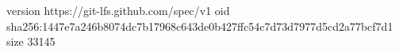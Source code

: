 version https://git-lfs.github.com/spec/v1
oid sha256:1447e7a246b8074dc7b17968c643de0b427ffc54c7d73d7977d5cd2a77bcf7d1
size 33145
